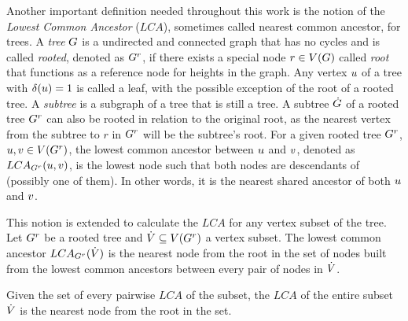 \documentclass[msc,english,table,xcdraw]{ppgccufmg}
\begin{document}
Another important definition needed throughout this work is the notion of the
\textit{Lowest Common Ancestor} ($LCA$), sometimes called nearest common 
ancestor, for trees. 
A \textit{tree} $G$ is a undirected and connected graph that has no cycles 
and is called \textit{rooted}, denoted as $G^{r}$, if there exists a special 
node $r \in V(G)$ called \textit{root} that functions as a reference 
node for heights in the graph.
Any vertex $u$ of a tree with $\delta(u) = 1$ is called a leaf, 
with the possible exception of the root of a rooted tree.
A \textit{subtree} is a subgraph of a tree that is still a tree. 
A subtree $\dot{G}$ of a rooted tree $G^{r}$ can also be rooted in relation 
to the original root, as the nearest vertex from the subtree to $r$ in 
$G^{r}$ will be the subtree's root.
For a given rooted tree $G^{r}$, $u,v \in V(G^{r})$, the 
lowest common ancestor between $u$ and $v$, denoted as $LCA_{G^{r}}(u, v)$, is the lowest node such that both nodes are descendants 
of (possibly one of them).
In other words, it is the nearest shared ancestor of both $u$ and
$v$.



This notion is extended to calculate the $LCA$ for any vertex subset of the 
tree. 
Let $G^{r}$ be a rooted tree and $\dot{V} \subseteq V(G^{r})$ a 
vertex subset. 
The lowest common ancestor $LCA_{G^{r}}(\dot{V})$ is the nearest node from 
the root in the set of nodes built from the lowest common ancestors between 
every pair of nodes in $\dot{V}$.


Given the set of every pairwise $LCA$ of the subset, the $LCA$ of the entire 
subset $\dot{V}$ is the nearest node from the root in the set.
\end{document}
